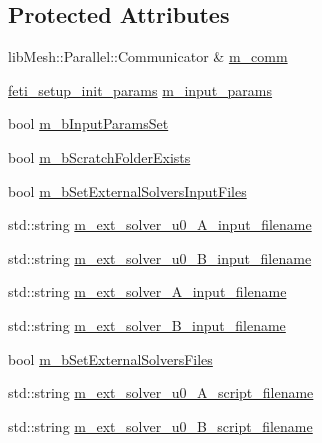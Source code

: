 \subsection*{Protected Attributes}
\begin{DoxyCompactItemize}
\item 
lib\+Mesh\+::\+Parallel\+::\+Communicator \& \hyperlink{classcarl_1_1_solver___files___setup_aa8049195d5e383a0ca4295795e3f5751}{m\+\_\+comm}
\item 
\hyperlink{structcarl_1_1feti__setup__init__params}{feti\+\_\+setup\+\_\+init\+\_\+params} \hyperlink{classcarl_1_1_solver___files___setup_aa5804bf6c6e506b382766333f232d3d5}{m\+\_\+input\+\_\+params}
\item 
bool \hyperlink{classcarl_1_1_solver___files___setup_a7187af3c4a90be2d8ad2a25c11c0e910}{m\+\_\+b\+Input\+Params\+Set}
\item 
bool \hyperlink{classcarl_1_1_solver___files___setup_ac59627eab870e65887560595d0fbc025}{m\+\_\+b\+Scratch\+Folder\+Exists}
\item 
bool \hyperlink{classcarl_1_1_solver___files___setup_ae9334ddcfaace89ab70ea918190cfd08}{m\+\_\+b\+Set\+External\+Solvers\+Input\+Files}
\item 
std\+::string \hyperlink{classcarl_1_1_solver___files___setup_a32c0d90d116aab36f712795956403913}{m\+\_\+ext\+\_\+solver\+\_\+u0\+\_\+\+A\+\_\+input\+\_\+filename}
\item 
std\+::string \hyperlink{classcarl_1_1_solver___files___setup_a682f749b73abaaffa3fdcd8b272eda2e}{m\+\_\+ext\+\_\+solver\+\_\+u0\+\_\+\+B\+\_\+input\+\_\+filename}
\item 
std\+::string \hyperlink{classcarl_1_1_solver___files___setup_ae236e05ce11d2249f91f5a52906149a7}{m\+\_\+ext\+\_\+solver\+\_\+\+A\+\_\+input\+\_\+filename}
\item 
std\+::string \hyperlink{classcarl_1_1_solver___files___setup_a135a9a518b294dbc996850eb0209678d}{m\+\_\+ext\+\_\+solver\+\_\+\+B\+\_\+input\+\_\+filename}
\item 
bool \hyperlink{classcarl_1_1_solver___files___setup_ad93c68f661273a66d319906dbfe080b5}{m\+\_\+b\+Set\+External\+Solvers\+Files}
\item 
std\+::string \hyperlink{classcarl_1_1_solver___files___setup_ac870acbdb942520edc49f0935605dd0b}{m\+\_\+ext\+\_\+solver\+\_\+u0\+\_\+\+A\+\_\+script\+\_\+filename}
\item 
std\+::string \hyperlink{classcarl_1_1_solver___files___setup_a890a41a7fb4b1130eb9fe558a9509af2}{m\+\_\+ext\+\_\+solver\+\_\+u0\+\_\+\+B\+\_\+script\+\_\+filename}

\end{DoxyCompactItemize}
